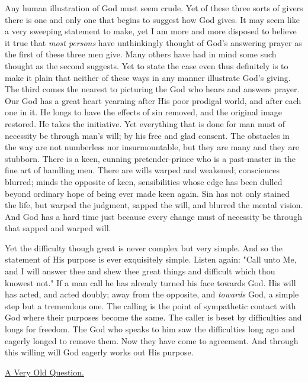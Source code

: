 Any human illustration of God must seem crude. Yet of these three sorts of
givers there is one and only one that begins to suggest how God gives. It
may seem like a very sweeping statement to make, yet I am more and more
disposed to believe it true that \textit{most persons} have unthinkingly thought
of God's answering prayer as the first of these three men give. Many
others have had in mind some such thought as the second suggests. Yet to
state the case even thus definitely is to make it plain that neither of
these ways in any manner illustrate God's giving. The third comes the
nearest to picturing the God who hears and answers prayer. Our God has a
great heart yearning after His poor prodigal world, and after each one in
it. He longs to have the effects of sin removed, and the original image
restored. He takes the initiative. Yet everything that is done for man
must of necessity be through man's will; by his free and glad consent. The
obstacles in the way are not numberless nor insurmountable, but they are
many and they are stubborn. There is a keen, cunning pretender-prince who
is a past-master in the fine art of handling men. There are wills warped
and weakened; consciences blurred; minds the opposite of keen,
sensibilities whose edge has been dulled beyond ordinary hope of being
ever made keen again. Sin has not only stained the life, but warped the
judgment, sapped the will, and blurred the mental vision. And God has a
hard time just because every change must of necessity be through that
sapped and warped will.

Yet the difficulty though great is never complex but very simple. And so
the statement of His purpose is ever exquisitely simple. Listen again:
"Call unto Me, and I will answer thee and shew thee great things and
difficult which thou knowest not." If a man call he has already turned his
face towards God. His will has acted, and acted doubly; away from the
opposite, and \textit{towards} God, a simple step but a tremendous one. The
calling is the point of sympathetic contact with God where their purposes
become the same. The caller is beset by difficulties and longs for
freedom. The God who speaks to him saw the difficulties long ago and
eagerly longed to remove them. Now they have come to agreement. And
through this willing will God eagerly works out His purpose.



\underline{A Very Old Question.}



